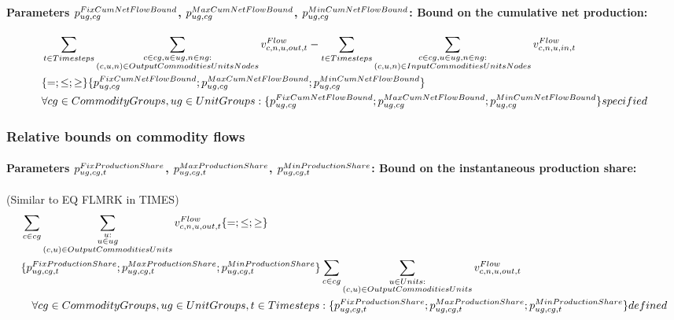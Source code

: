 \paragraph{Parameters $\pFixCumNetFlowBound$, $\pMaxCumNetFlowBound$, $\pMinCumNetFlowBound$: Bound on the cumulative net production:}
\begin{align} \label{eq:cumnetflowbound}
&\sum_{\timesteps} \sum_{\substack{\commodity \in \commoditygroup, \unit \in \unitgroup, \node \in \nodegroup: \\ \OutputCommoditiesUnitsNodes}} \vFlow[\commodity,\node,\unit,out,\timestep] - \sum_{\timesteps} \sum_{\substack{\commodity \in \commoditygroup, \unit \in \unitgroup, \node \in \nodegroup: \\ \InputCommoditiesUnitsNodes}} \vFlow[\commodity,\node,\unit,in,\timestep]  \nonumber \\
&\{=;\le;\ge\} \{\pFixCumNetFlowBound; \pMaxCumNetFlowBound; \pMinCumNetFlowBound \} \nonumber \\
&\forall \commoditygroups, \unitgroups: \{\pFixCumNetFlowBound; \pMaxCumNetFlowBound; \pMinCumNetFlowBound \} specified
\end{align}



\subsubsection{Relative bounds on commodity flows}

\paragraph{Parameters $\pFixProductionShare$, $\pMaxProductionShare$, $\pMinProductionShare$: Bound on the instantaneous production share:}
(Similar to EQ FLMRK in TIMES)
\begin{align} \label{eq:productionshare}
&\sum_{\commodity \in \commoditygroup} \sum_{\substack{\unit: \\ \unit \in \unitgroup \\ \OutputCommoditiesUnits}} \vFlow[\commodity,\node,\unit,out,\timestep]
 \{=;\le;\ge\} \nonumber \\
&\{\pFixProductionShare ; \pMaxProductionShare ; \pMinProductionShare \} \sum_{\commodity \in \commoditygroup} \sum_{\substack{\units: \\ \OutputCommoditiesUnits}} \vFlow[\commodity,\node, \unit,out,\timestep] \nonumber \\
&\quad \forall \commoditygroups, \unitgroups, \timesteps : \{\pFixProductionShare ; \pMaxProductionShare ; \pMinProductionShare \} defined
\end{align}

